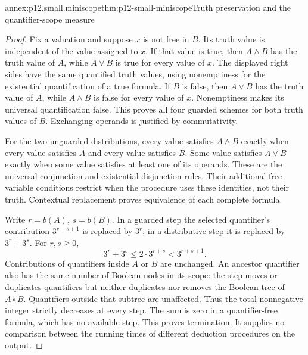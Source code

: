\begin{annexitem}{annex:p12.small.miniscope}{thm:p12-small-miniscope}{Truth preservation and the quantifier-scope measure}
\begin{proof}
Fix a valuation and suppose \(x\) is not free in \(B\).
Its truth value is independent of the value assigned to \(x\).
If that value is true, then \(A\land B\) has the truth value
of \(A\), while \(A\lor B\) is true for every value of \(x\).
The displayed right sides have the same quantified truth values,
using nonemptiness for the existential quantification of a true
formula. If \(B\) is false, then \(A\lor B\) has the truth
value of \(A\), while \(A\land B\) is false for every value
of \(x\). Nonemptiness makes its universal quantification false.
This proves all four guarded schemes for both truth values of
\(B\). Exchanging operands is justified by commutativity.

For the two unguarded distributions, every value satisfies
\(A\land B\) exactly when every value satisfies \(A\) and
every value satisfies \(B\). Some value satisfies \(A\lor B\)
exactly when some value satisfies at least one of its operands.
These are the universal-conjunction and existential-disjunction
rules. Their additional free-variable conditions restrict when the
procedure uses these identities, not their truth. Contextual
replacement proves equivalence of each complete formula.

Write \(r=b(A)\), \(s=b(B)\). In a guarded step the selected
quantifier's contribution \(3^{r+s+1}\) is replaced by
\(3^r\); in a distributive step it is replaced by
\(3^r+3^s\). For \(r,s\ge0\),
\[
 3^r+3^s\le2\cdot3^{r+s}<3^{r+s+1}.
\]
Contributions of quantifiers inside \(A\) or \(B\) are unchanged.
An ancestor quantifier also has the same number of Boolean nodes
in its scope: the step moves or duplicates quantifiers but neither
duplicates nor removes the Boolean tree of \(A\circ B\).
Quantifiers outside that subtree are unaffected. Thus the total
nonnegative integer strictly decreases at every step. The sum is
zero in a quantifier-free formula, which has no available step.
This proves termination. It supplies no comparison between the
running times of different deduction procedures on the output.
\end{proof}
\end{annexitem}

